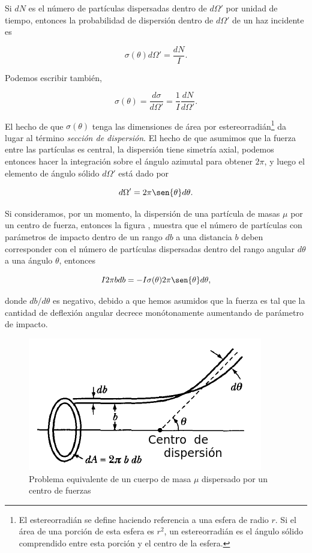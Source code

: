 \documentclass[a4paper,10pt]{article}
\numberwithin{equation}{section}
\begin{document}
Si $dN$ es el número de partículas dispersadas dentro de $d\Omega'$ por unidad
de tiempo, entonces la probabilidad de dispersión dentro de $d\Omega'$ de 
un haz incidente es

\begin{equation}
 \sigma (\theta) d\Omega' = \frac{dN}{I}.
 \label{eq:disper2}
\end{equation}

Podemos escribir también,

\begin{equation}
 \sigma(\theta) = \frac{d\sigma}{d\Omega'} = \frac{1}{I}\frac{dN}{d\Omega'}.
 \label{eq:disper3}
\end{equation}

El hecho de que $\sigma(\theta)$ tenga las dimensiones de área por estereorradián\footnote{El estereorradián 
se define haciendo referencia a una esfera de radio $r$. Si el área de una porción de esta esfera es $r^2$, un estereorradián es el ángulo sólido comprendido entre esta porción y el centro de la esfera.}
da lugar al término \emph{sección de dispersión}. El hecho de que asumimos que 
la fuerza entre las partículas es central, la dispersión tiene simetría
axial, podemos entonces hacer la integración sobre el ángulo azimutal 
para obtener $2\pi$, y luego el elemento de ángulo sólido $d\Omega'$ está
dado por 

\begin{equation}
 d\Omega' = 2\pi \sen{\theta} d\theta.
 \label{eq:disper4}
\end{equation}

Si consideramos, por un momento, la dispersión de una partícula de 
masas $\mu$ por un centro de fuerza, entonces la figura ,
muestra que el número de partículas con parámetros de impacto dentro de 
un rango $db$ a una distancia $b$ deben corresponder con el número de 
partículas dispersadas dentro del rango angular $d\theta$ a una ángulo $\theta$,
entonces

\begin{equation}
 I2\pi b db = - I \sigma(\theta)2\pi\sen{\theta}d\theta,
 \label{eq:disper5}
\end{equation}

donde $db/d\theta$ es negativo, debido a que hemos asumidos que la fuerza 
es tal que la cantidad de deflexión angular decrece monótonamente aumentando 
de parámetro de impacto. 

\begin{figure}[H]
 \center
 \includegraphics[scale=0.5]{problema3fig2}
 \caption{Problema equivalente de un cuerpo de masa $\mu$ dispersado 
 por un centro de fuerzas}
 \label{fig:problema3fig2}
\end{figure}
\end{document}
